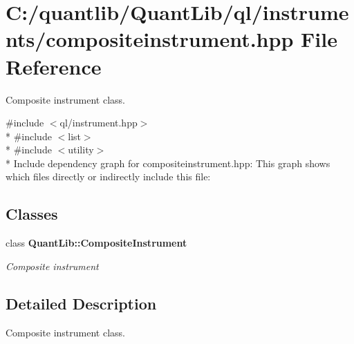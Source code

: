 \section{C\+:/quantlib/\+Quant\+Lib/ql/instruments/compositeinstrument.hpp File Reference}
\label{compositeinstrument_8hpp}


Composite instrument class.  


{\ttfamily \#include $<$ql/instrument.\+hpp$>$}\\*
{\ttfamily \#include $<$list$>$}\\*
{\ttfamily \#include $<$utility$>$}\\*
Include dependency graph for compositeinstrument.\+hpp\+:
This graph shows which files directly or indirectly include this file\+:
\subsection*{Classes}
\begin{DoxyCompactItemize}
\item 
class {\bf Quant\+Lib\+::\+Composite\+Instrument}
\begin{DoxyCompactList}\small\item\em Composite instrument \end{DoxyCompactList}\end{DoxyCompactItemize}


\subsection{Detailed Description}
Composite instrument class. 

